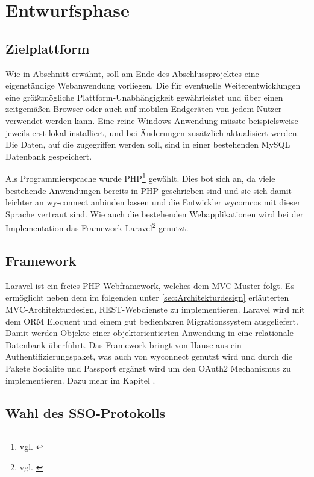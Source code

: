 \section{Entwurfsphase} 
\label{sec:Entwurfsphase}

\subsection{Zielplattform}
\label{sec:Zielplattform}

Wie in Abschnitt  erwähnt, soll am Ende des Abschlussprojektes eine eigenständige Webanwendung vorliegen. Die für eventuelle Weiterentwicklungen eine größtmögliche Plattform-Unabhängigkeit gewährleistet und über einen zeitgemäßen Browser oder auch auf mobilen Endgeräten von jedem Nutzer verwendet werden kann. Eine  reine Windows-Anwendung müsste beispielsweise jeweils erst lokal installiert, und bei Änderungen zusätzlich aktualisiert werden.
Die Daten, auf die zugegriffen werden soll, sind in einer bestehenden MySQL Datenbank gespeichert. 

Als Programmiersprache wurde \ac{PHP}\footnote{vgl. \cite{PHP}} gewählt. Dies bot sich an, da viele bestehende Anwendungen bereits in PHP geschrieben sind und sie sich damit leichter an wy-connect anbinden lassen und die Entwickler wycomcos mit dieser Sprache vertraut sind. 
Wie auch die bestehenden Webapplikationen wird bei der Implementation das Framework Laravel\footnote{vgl. \cite{Laravel}} genutzt.

\subsection{Framework}
\label{sec:Framework}

Laravel ist ein freies \ac{PHP}-Webframework, welches dem \ac{MVC}-Muster folgt. 
Es ermöglicht neben dem im folgenden unter \ref{sec:Architekturdesign} erläuterten MVC-Architekturdesign, \ac{REST}-Webdienste zu implementieren.
Laravel wird mit dem \ac{ORM} Eloquent und einem gut bedienbaren Migrationssystem ausgeliefert. Damit werden Objekte einer objektorientierten Anwendung in eine relationale Datenbank überführt.
Das Framework bringt von Hause aus ein Authentifizierungspaket, was auch von wyconnect genutzt wird und durch die Pakete Socialite und Passport ergänzt wird um den OAuth2 Mechanismus zu implementieren. Dazu mehr im Kapitel .

\subsection{Wahl des SSO-Protokolls}
\label{sec:Protokollwahl}

